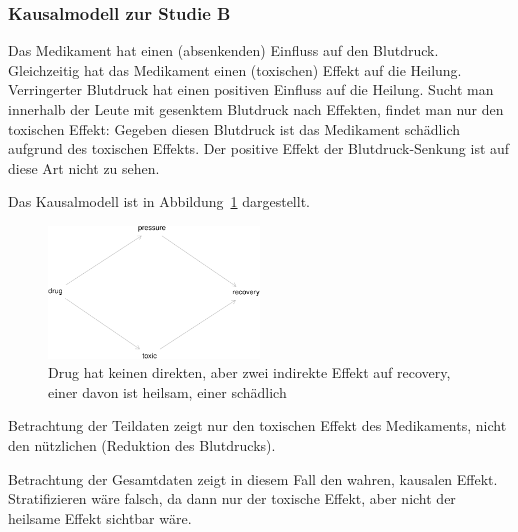 \documentclass[
  a4paper,
  DIV=11]{scrreprt}
\theoremstyle{definition}
\theoremstyle{remark}
\begin{document}
\hypertarget{kausalmodell-zur-studie-b}{%
\subsubsection{Kausalmodell zur Studie
B}\label{kausalmodell-zur-studie-b}}

Das Medikament hat einen (absenkenden) Einfluss auf den Blutdruck.
Gleichzeitig hat das Medikament einen (toxischen) Effekt auf die
Heilung. Verringerter Blutdruck hat einen positiven Einfluss auf die
Heilung. Sucht man innerhalb der Leute mit gesenktem Blutdruck nach
Effekten, findet man nur den toxischen Effekt: Gegeben diesen Blutdruck
ist das Medikament schädlich aufgrund des toxischen Effekts. Der
positive Effekt der Blutdruck-Senkung ist auf diese Art nicht zu sehen.

Das Kausalmodell ist in Abbildung~\ref{fig-dag-studie-b} dargestellt.

\begin{figure}

{\centering \includegraphics[width=0.5\textwidth,height=\textheight]{./kausal_files/figure-pdf/fig-dag-studie-b-1.pdf}

}

\caption{\label{fig-dag-studie-b}Drug hat keinen direkten, aber zwei
indirekte Effekt auf recovery, einer davon ist heilsam, einer schädlich}

\end{figure}

Betrachtung der Teildaten zeigt nur den toxischen Effekt des
Medikaments, nicht den nützlichen (Reduktion des Blutdrucks).

\begin{tcolorbox}[enhanced jigsaw, title=\textcolor{quarto-callout-important-color}{\faExclamation}\hspace{0.5em}{Wichtig}, bottomtitle=1mm, bottomrule=.15mm, titlerule=0mm, colbacktitle=quarto-callout-important-color!10!white, colframe=quarto-callout-important-color-frame, leftrule=.75mm, left=2mm, toprule=.15mm, colback=white, arc=.35mm, breakable, toptitle=1mm, opacityback=0, rightrule=.15mm, coltitle=black, opacitybacktitle=0.6]

Betrachtung der Gesamtdaten zeigt in diesem Fall den wahren, kausalen
Effekt. Stratifizieren wäre falsch, da dann nur der toxische Effekt,
aber nicht der heilsame Effekt sichtbar wäre.

\end{tcolorbox}
\end{document}
